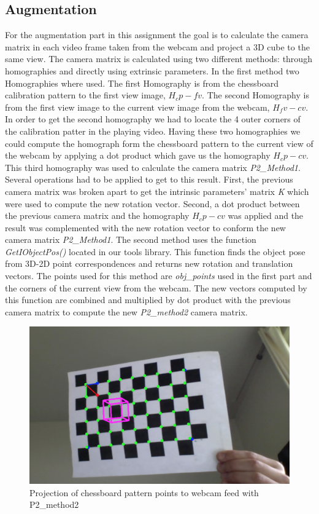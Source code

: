 \subsection{Augmentation}
For the augmentation part in this assignment the goal is to calculate the camera matrix in each video frame taken from the webcam and project a 3D cube to the same view. The camera matrix is calculated using two different methods: through homographies and directly using extrinsic parameters. \newline
In the first method two Homographies where used. The first Homography is from the chessboard calibration pattern to the first view image, \(H_cp-fv\). The second Homography is from the first view image to the current view image from the webcam, \(H_fv-cv\). In order to get the second homography we had to locate the 4 outer corners of the calibration patter in the playing video. Having these two homographies we could compute the homograph form the chessboard pattern to the current view of the webcam by applying a dot product which gave us the homography \(H_cp-cv\). This third homography was used to calculate the camera matrix \textsl{P2_Method1}. Several operations had to be applied to get to this result. First, the previous camera matrix was broken apart to get the intrinsic parameters' matrix \textsl{K} which were used to compute the new rotation vector. Second, a dot product between the previous camera matrix and the homography \(H_cp-cv\) was applied and the result was complemented with the new rotation vector to conform the new camera matrix \textsl{P2_Method1}.\newline
The second method uses the function \textsl{GetIObjectPos()} located in our tools library. This function finds the object pose from 3D-2D point correspondences and returns new rotation and translation vectors. The points used for this method are \textsl{obj_points} used in the first part and the corners of the current view from the webcam. The new vectors computed by this function are combined and multiplied by dot product with the previous camera matrix to compute the new \textsl{P2_method2} camera matrix.
\begin{figure}
	\centering
	\includegraphics[scale=0.9]{images/p2_method2.jpg}
	\caption{Projection of chessboard pattern points to webcam feed with P2_method2}
	\label{fig:method2}
\end{figure}

